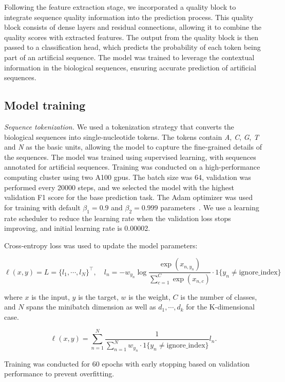 \documentclass[pdflatex, sn-mathphys-num, lineno]{sn-jnl}%
\theoremstyle{thmstyleone}%
\theoremstyle{thmstyletwo}%
\theoremstyle{thmstylethree}%
\begin{document}
Following the feature extraction stage, we incorporated a quality block to integrate sequence quality information into the prediction process.
This quality block consists of dense layers and residual connections, allowing it to combine the quality scores with extracted features.
The output from the quality block is then passed to a classification head, which predicts the probability of each token being part of an artificial sequence.
The model was trained to leverage the contextual information in the biological sequences, ensuring accurate prediction of artificial sequences.


\subsection{Model training}\label{ssec:training}

\textit{Sequence tokenization.} We used a tokenization strategy that converts the biological sequences into single-nucleotide tokens.
The tokens contain \emph{A}, \emph{C}, \emph{G}, \emph{T} and \emph{N} as the basic units, allowing the model to capture the fine-grained details of the sequences.
The model was trained using supervised learning, with sequences annotated for artificial sequences.
Training was conducted on a high-performance computing cluster using two A100 \glspl{gpu}.
The batch size was \num{64}, validation was performed every \num{20000} steps, and we selected the model with the highest validation F1 score for the base prediction task.
The Adam optimizer was used for training with default \( \beta_{1} = 0.9 \) and \( \beta_{2} = 0.999 \) parameters~\cite{kingma2014adam}.
We use a learning rate scheduler to reduce the learning rate when the validation loss stops improving, and initial learning rate is \num{0.00002}.

Cross-entropy loss was used to update the model parameters:


\[
	\ell(x, y) = L = \{l_1,\cdots,l_N\}^\top, \quad
	l_n = - w_{y_n} \log \frac{\exp(x_{n,y_n})}{\sum_{c=1}^C \exp(x_{n,c})}
	\cdot 1\{y_n \not= \textrm{ignore\_index}\}
\]

where \( x \) is the input, \( y \) is the target, \( w \) is the weight,
\( C \) is the number of classes, and \( N \) spans the minibatch dimension as well as
\( d_1, \cdots, d_k \) for the K-dimensional case.

\[
	\ell(x, y) =   \sum_{n=1}^N \frac{1}{\sum_{n=1}^N w_{y_n} \cdot 1\{y_n \not= \textrm{ignore\_index}\}} l_n
	.\]

Training was conducted for \num{60} epochs with early stopping based on validation performance to prevent overfitting.
\end{document}
